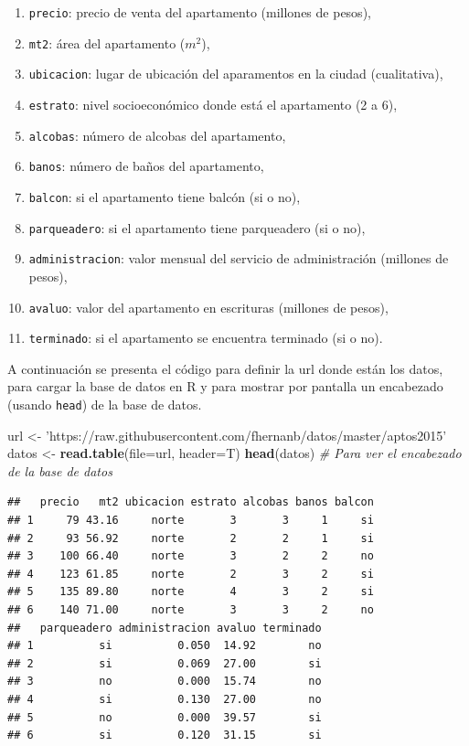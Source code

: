 \documentclass[10pt,]{krantz}
\makeatletter
\newenvironment{Shaded}{\begin{snugshade}}{\end{snugshade}}
\newcommand{\KeywordTok}[1]{\textcolor[rgb]{0.13,0.29,0.53}{\textbf{{#1}}}}
\newcommand{\DataTypeTok}[1]{\textcolor[rgb]{0.13,0.29,0.53}{{#1}}}
\newcommand{\StringTok}[1]{\textcolor[rgb]{0.31,0.60,0.02}{{#1}}}
\newcommand{\CommentTok}[1]{\textcolor[rgb]{0.56,0.35,0.01}{\textit{{#1}}}}
\newcommand{\NormalTok}[1]{{#1}}
\providecommand{\tightlist}{%
  \setlength{\itemsep}{0pt}\setlength{\parskip}{0pt}}
\newenvironment{kframe}{%
\medskip{}
\setlength{\fboxsep}{.8em}
 \def\at@end@of@kframe{}%
 \ifinner\ifhmode%
  \def\at@end@of@kframe{\end{minipage}}%
  \begin{minipage}{\columnwidth}%
 \fi\fi%
 \def\FrameCommand##1{\hskip\@totalleftmargin \hskip-\fboxsep
 \colorbox{shadecolor}{##1}\hskip-\fboxsep
     \hskip-\linewidth \hskip-\@totalleftmargin \hskip\columnwidth}%
 \MakeFramed {\advance\hsize-\width
   \@totalleftmargin\z@ \linewidth\hsize
   \@setminipage}}%
 {\par\unskip\endMakeFramed%
 \at@end@of@kframe}
\renewenvironment{Shaded}{\begin{kframe}}{\end{kframe}}
\makeatother
\begin{document}
\begin{enumerate}
\def\labelenumi{\arabic{enumi}.}
\tightlist
\item
  \texttt{precio}: precio de venta del apartamento (millones de pesos),
\item
  \texttt{mt2}: área del apartamento (\(m^2\)),
\item
  \texttt{ubicacion}: lugar de ubicación del aparamentos en la ciudad
  (cualitativa),
\item
  \texttt{estrato}: nivel socioeconómico donde está el apartamento (2 a
  6),
\item
  \texttt{alcobas}: número de alcobas del apartamento,
\item
  \texttt{banos}: número de baños del apartamento,
\item
  \texttt{balcon}: si el apartamento tiene balcón (si o no),
\item
  \texttt{parqueadero}: si el apartamento tiene parqueadero (si o no),
\item
  \texttt{administracion}: valor mensual del servicio de administración
  (millones de pesos),
\item
  \texttt{avaluo}: valor del apartamento en escrituras (millones de
  pesos),
\item
  \texttt{terminado}: si el apartamento se encuentra terminado (si o
  no).
\end{enumerate}

A continuación se presenta el código para definir la url donde están los
datos, para cargar la base de datos en R y para mostrar por pantalla un
encabezado (usando \texttt{head}) de la base de datos.

\begin{Shaded}
\begin{Highlighting}[]
\NormalTok{url <-}\StringTok{ 'https://raw.githubusercontent.com/fhernanb/datos/master/aptos2015'}
\NormalTok{datos <-}\StringTok{ }\KeywordTok{read.table}\NormalTok{(}\DataTypeTok{file=}\NormalTok{url, }\DataTypeTok{header=}\NormalTok{T)}
\KeywordTok{head}\NormalTok{(datos)  }\CommentTok{# Para ver el encabezado de la base de datos}
\end{Highlighting}
\end{Shaded}

\begin{verbatim}
##   precio   mt2 ubicacion estrato alcobas banos balcon
## 1     79 43.16     norte       3       3     1     si
## 2     93 56.92     norte       2       2     1     si
## 3    100 66.40     norte       3       2     2     no
## 4    123 61.85     norte       2       3     2     si
## 5    135 89.80     norte       4       3     2     si
## 6    140 71.00     norte       3       3     2     no
##   parqueadero administracion avaluo terminado
## 1          si          0.050  14.92        no
## 2          si          0.069  27.00        si
## 3          no          0.000  15.74        no
## 4          si          0.130  27.00        no
## 5          no          0.000  39.57        si
## 6          si          0.120  31.15        si
\end{verbatim}
\end{document}
